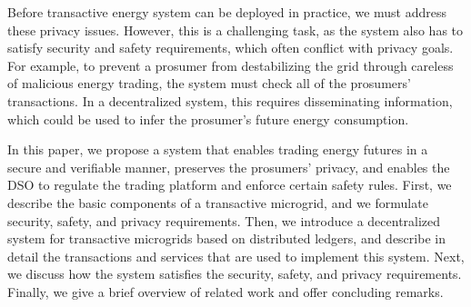 Before transactive energy system can be deployed in practice, we must address these privacy issues.
However, this is a challenging task, as the system also has to satisfy security and safety requirements, which often conflict with privacy goals.
For example, to prevent a prosumer from destabilizing the grid through careless of malicious energy trading, the system must check all of the prosumers' transactions.
In a decentralized system, this requires disseminating information, which could be used to infer the prosumer's future energy consumption.

In this paper, we propose a system that enables trading energy futures in a secure and verifiable manner, preserves the prosumers' privacy, and enables the DSO to regulate the trading platform and enforce certain safety rules.
First, we describe the basic components of a transactive microgrid, and we formulate security, safety, and privacy requirements. 
Then, we introduce a decentralized system for transactive microgrids based on distributed ledgers, and describe in detail the transactions and services that are used to implement this system.
Next, we discuss how the system satisfies the security, safety, and privacy requirements.
Finally, we give a brief overview of related work and offer concluding remarks.

